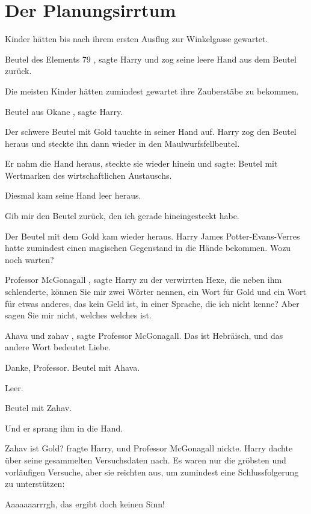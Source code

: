 \chapter{Der Planungsirrtum}

 Kinder hätten bis nach ihrem ersten Ausflug zur
Winkelgasse gewartet.

\glqq Beutel des Elements 79\grqq{} , sagte Harry und zog seine leere Hand aus
dem Beutel zurück.

Die meisten Kinder hätten zumindest gewartet ihre Zauberstäbe zu bekommen.

\glqq Beutel aus Okane\grqq{} , sagte Harry.

Der schwere Beutel mit Gold tauchte in seiner Hand auf. Harry zog den Beutel
heraus und steckte ihn dann wieder in den Maulwurfsfellbeutel.

Er nahm die Hand heraus, steckte sie wieder hinein und sagte: \glqq Beutel mit
Wertmarken des wirtschaftlichen Austauschs.\grqq{}

Diesmal kam seine Hand leer heraus.

\glqq Gib mir den Beutel zurück, den ich gerade hineingesteckt habe.\grqq{}

Der Beutel mit dem Gold kam wieder heraus. Harry James Potter-Evans-Verres hatte
zumindest einen magischen Gegenstand in die Hände bekommen. Wozu noch
warten?

\glqq Professor McGonagall\grqq{} , sagte Harry zu der verwirrten Hexe, die
neben ihm schlenderte, \glqq können Sie mir zwei Wörter nennen, ein Wort für
Gold und ein Wort für etwas anderes, das kein Geld ist, in einer Sprache,
die ich nicht kenne? Aber sagen Sie mir nicht, welches welches ist.\grqq{}

\glqq Ahava und zahav\grqq{} , sagte Professor McGonagall. \glqq Das ist
Hebräisch, und das andere Wort bedeutet Liebe.\grqq{}

\glqq Danke, Professor. Beutel mit Ahava.\grqq{}

Leer.

\glqq Beutel mit Zahav.\grqq{}

Und er sprang ihm in die Hand.

\glqq Zahav ist Gold?\grqq{} fragte Harry, und Professor McGonagall nickte.
Harry dachte über seine gesammelten Versuchsdaten nach. Es waren nur die
gröbsten und vorläufigen Versuche, aber sie reichten aus, um zumindest eine
Schlussfolgerung zu unterstützen:

\glqq Aaaaaaarrrgh, das ergibt doch keinen Sinn!\grqq{}

